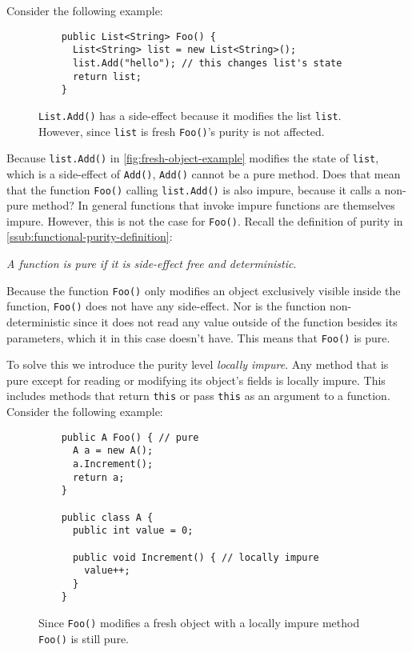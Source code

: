 \documentclass[a4paper,12pt]{article}
\begin{document}
Consider the following example:

\begin{figure}[H]
  \centering
  \begin{lstlisting}
    public List<String> Foo() {
      List<String> list = new List<String>();
      list.Add("hello"); // this changes list's state
      return list;
    }
  \end{lstlisting}
  \caption{\texttt{List.Add()} has a side-effect because it modifies the list \texttt{list}. However, since \texttt{list} is fresh \texttt{Foo()}'s purity is not affected.}
  \label{fig:fresh-object-example}
\end{figure}

Because \texttt{list.Add()} in \autoref{fig:fresh-object-example} modifies the state of \texttt{list}, which is a side-effect of \texttt{Add()}, \texttt{Add()} cannot be a pure method. Does that mean that the function \texttt{Foo()} calling \texttt{list.Add()} is also impure, because it calls a non-pure method? In general functions that invoke impure functions are themselves impure. However, this is not the case for \texttt{Foo()}. Recall the definition of purity in \autoref{ssub:functional-purity-definition}:

\textit{A function is pure if it is side-effect free and deterministic}.

Because the function \texttt{Foo()} only modifies an object exclusively visible inside the function, \texttt{Foo()} does not have any side-effect. Nor is the function non-deterministic since it does not read any value outside of the function besides its parameters, which it in this case doesn't have. This means that \texttt{Foo()} is pure.

To solve this we introduce the purity level \textit{locally impure}. Any method that is pure except for reading or modifying its object's fields is locally impure. This includes methods that return \texttt{this} or pass \texttt{this} as an argument to a function. Consider the following example:

\begin{figure}[H]
  \centering
  \begin{lstlisting}
    public A Foo() { // pure
      A a = new A();
      a.Increment();
      return a;
    }

    public class A {
      public int value = 0;

      public void Increment() { // locally impure
        value++;
      }
    }
  \end{lstlisting}
  \caption{Since \texttt{Foo()} modifies a fresh object with a locally impure method \texttt{Foo()} is still pure.}
  \label{fig:locally-impure-example}
\end{figure}
\end{document}
